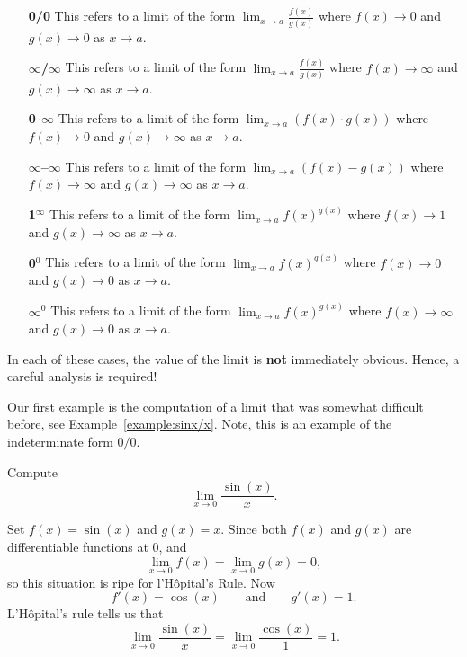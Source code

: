 \begin{definition}\hfil
\begin{itemize}
\item[\textbf{0/0}] This refers to a limit of the form $\lim_{x\to a}
  \frac{f(x)}{g(x)}$ where $f(x)\to 0$ and $g(x)\to 0$ as $x\to a$.
\item[\textbf{$\pmb\infty$/$\pmb\infty$}] This refers to a limit of the form $\lim_{x\to a}
  \frac{f(x)}{g(x)}$ where $f(x)\to \infty$ and $g(x)\to \infty$ as $x\to a$.
\item[\textbf{0\,$\pmb{\cdot\infty}$}] This refers to a limit of the form $\lim_{x\to a}
  \left(f(x)\cdot g(x)\right)$ where $f(x)\to 0$ and $g(x)\to \infty$ as $x\to a$.
\item[\textbf{$\pmb\infty$--$\pmb\infty$}] This refers to a limit of the form $\lim_{x\to a}\left(
  f(x)-g(x)\right)$ where $f(x)\to \infty$ and $g(x)\to \infty$ as $x\to a$.

\item[\textbf{1$^{\pmb\infty}$}] This refers to a limit of the form $\lim_{x\to a}
  f(x)^{g(x)}$ where $f(x)\to 1$ and $g(x)\to \infty$ as $x\to a$.
\item[\textbf{0$^\text{0}$}] This refers to a limit of the form $\lim_{x\to a}
  f(x)^{g(x)}$ where $f(x)\to 0$ and $g(x)\to 0$ as $x\to a$.
\item[\textbf{$\pmb\infty^\text{0}$}] This refers to a limit of the form $\lim_{x\to a}
  f(x)^{g(x)}$ where $f(x)\to \infty$ and $g(x)\to 0$ as $x\to a$.
\end{itemize}
In each of these cases, the value of the limit is \textbf{not} immediately
obvious. Hence, a careful analysis is required!
\end{definition}

Our first example is the computation of a limit that was somewhat
difficult before, see Example~\ref{example:sinx/x}. Note, this is an
example of the indeterminate form $0/0$.

\begin{example}[0/0]\label{example:sinx/x-lhopital}
Compute
\[
\lim_{x\to 0} \frac{\sin(x)}{x}.
\]
\end{example}

\begin{solution}
Set $f(x) = \sin(x)$ and $g(x) = x$.  Since both $f(x)$ and $g(x)$ are
differentiable functions at $0$, and 
\[
\lim_{x \to 0} f(x) = \lim_{x \to 0}g(x) = 0,
\]
so this situation is ripe for l'H\^opital's Rule. Now 
\[
f'(x) = \cos(x) \qquad\text{and}\qquad g'(x) = 1.
\] 
L'H\^opital's rule tells us that 
\[
\lim_{x \to 0} \frac{\sin(x)}{x} = \lim_{x \to 0} \frac{\cos(x)}{1} = 1.
\]
\end{solution}


